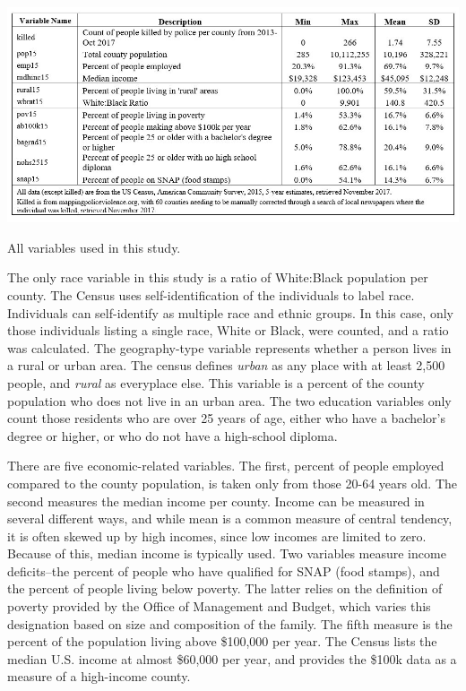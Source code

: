\documentclass[sigconf]{acmart}
\begin{document}
\begin{table}
\includegraphics[width=1.0\textwidth]{images/table1.jpg}
\caption{All variables used in this study.}
\end{table}

The only race variable in this study is a ratio of White:Black population per county.  The Census uses self-identification of the individuals to label race.  Individuals can self-identify as multiple race and ethnic groups.  In this case, only those individuals listing a single race, White or Black, were counted, and a ratio was calculated.  The geography-type variable represents whether a person lives in a rural or urban area.  The census defines {\em urban} as any place with at least 2,500 people, and {\em rural} as everyplace else.  This variable is a percent of the county population who does not live in an urban area.  The two education variables only count those residents who are over 25 years of age, either who have a bachelor's degree or higher, or who do not have a high-school diploma.  

There are five economic-related variables.  The first, percent of people employed compared to the county population, is taken only from those 20-64 years old.  The second measures the median income per county.  Income can be measured in several different ways, and while mean is a common measure of central tendency, it is often skewed up by high incomes, since low incomes are limited to zero.  Because of this, median income is typically used.  Two variables measure income deficits--the percent of people who have qualified for SNAP (food stamps), and the percent of people living below poverty.  The latter relies on the definition of poverty provided by the Office of Management and Budget, which varies this designation based on size and composition of the family.  The fifth measure is the percent of the population living above \$100,000  per year. The Census lists the median U.S. income at almost \$60,000 per year, and provides the \$100k data as a measure of a high-income county.
\end{document}
